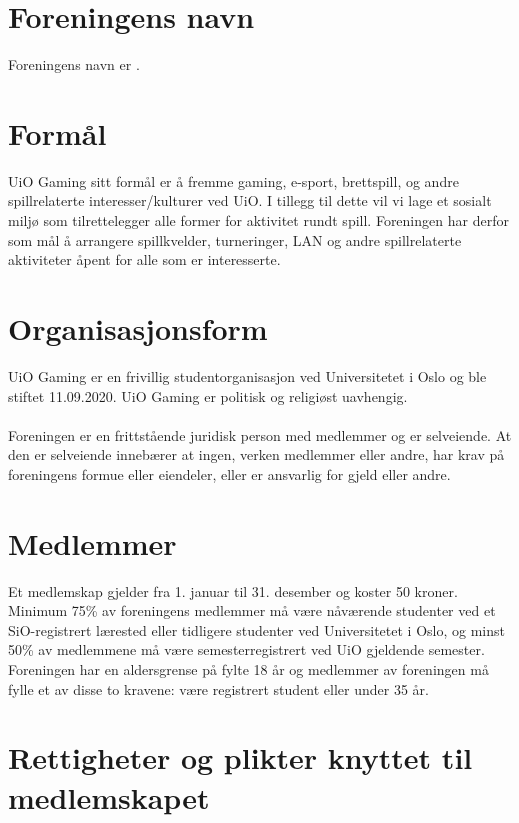 \documentclass[12pt,a4paper,norsk]{article}
\begin{document}



\section{Foreningens navn}
Foreningens navn er .


\section{Formål}

UiO Gaming sitt formål er å fremme gaming, e-sport, brettspill, og andre spillrelaterte interesser/kulturer ved UiO. I tillegg til dette vil vi lage et sosialt miljø som tilrettelegger alle former for aktivitet rundt spill. Foreningen har derfor som mål å arrangere spillkvelder, turneringer, LAN og andre spillrelaterte aktiviteter åpent for alle som er interesserte.



\section{Organisasjonsform}

UiO Gaming er en frivillig studentorganisasjon ved Universitetet i Oslo og ble stiftet 11.09.2020. UiO Gaming er politisk og religiøst uavhengig.
\\
\\
Foreningen er en frittstående juridisk person med medlemmer og er selveiende. At den er selveiende innebærer at ingen, verken medlemmer eller andre, har krav på foreningens formue eller eiendeler, eller er ansvarlig for gjeld eller andre.



\section{Medlemmer}

Et medlemskap gjelder fra 1. januar til 31. desember og koster 50 kroner. Minimum 75\% av foreningens medlemmer må være nåværende studenter ved et SiO-registrert lærested eller tidligere studenter ved Universitetet i Oslo, og minst 50\% av medlemmene må være semesterregistrert ved UiO gjeldende semester. Foreningen har en aldersgrense på fylte 18 år og medlemmer av foreningen må fylle et av disse to kravene: være registrert student eller under 35 år.



\section{Rettigheter og plikter knyttet til medlemskapet}
\end{document}
